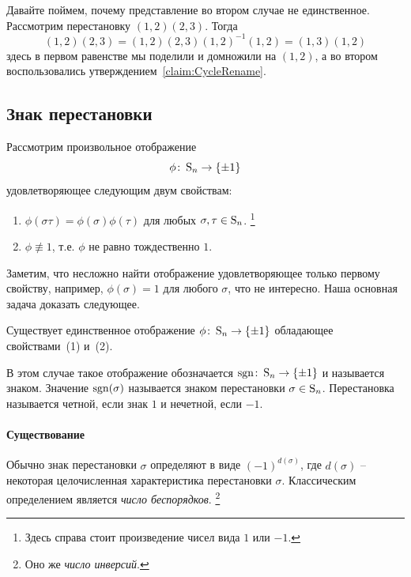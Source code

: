 Давайте поймем, почему представление во втором случае не единственное.
Рассмотрим перестановку $(1,2)(2,3)$.
Тогда
\[
(1,2)(2,3) = (1,2)(2,3)(1,2)^{-1}(1,2) = (1,3)(1,2)
\]
здесь в первом равенстве мы поделили и домножили на $(1,2)$, а во втором воспользовались утверждением~\ref{claim:CycleRename}.

\subsection{Знак перестановки}
\label{section::PermSign}

Рассмотрим произвольное отображение 
\[
\phi\colon \operatorname{S}_{n}\to \{\pm 1\}
\]
удовлетворяющее следующим двум свойствам:
\begin{enumerate}
\item $\phi(\sigma \tau) = \phi(\sigma)\phi(\tau)$ для любых $\sigma, \tau \in\operatorname{S}_{n}$.%
\footnote{Здесь справа стоит произведение чисел вида $1$ или $-1$.}

\item $\phi\not\equiv 1$, т.е. $\phi$ не равно тождественно $1$.
\end{enumerate}
Заметим, что несложно найти отображение удовлетворяющее только первому свойству, например, $\phi(\sigma) = 1$ для любого $\sigma$, что не интересно.
Наша основная задача доказать следующее.

\begin{claim}
Существует единственное отображение $\phi\colon \operatorname{S}_{n} \to \{\pm 1\}$ обладающее свойствами~(1) и~(2).
\end{claim}

В этом случае такое отображение обозначается $\operatorname{sgn}\colon \operatorname{S}_{n}\to \{\pm1\}$ и называется знаком.
Значение $\operatorname{sgn}(\sigma)$ называется знаком перестановки $\sigma\in\operatorname{S}_{n}$.
Перестановка называется четной, если знак $1$ и нечетной, если $-1$.

\paragraph{Существование}

Обычно знак перестановки $\sigma$ определяют в виде $(-1)^{d(\sigma)}$, где $d(\sigma)$ -- некоторая целочисленная характеристика перестановки $\sigma$.
Классическим определением является {\it число беспорядков}.%
\footnote{Оно же {\it число инверсий}.} 

